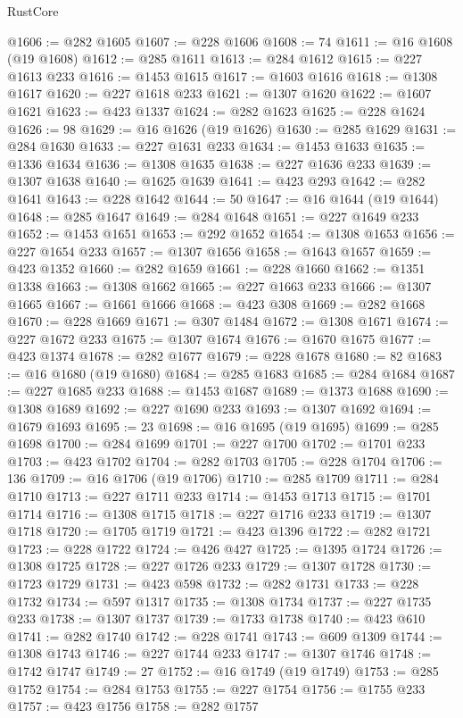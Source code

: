 \begin{lexlean}{RustCore}
\begin{coremodule}
@1606 := @282 @1605
@1607 := @228 @1606
@1608 := 74
@1611 := @16 @1608 (@19 @1608)
@1612 := @285 @1611
@1613 := @284 @1612
@1615 := @227 @1613 @233
@1616 := @1453 @1615
@1617 := @1603 @1616
@1618 := @1308 @1617
@1620 := @227 @1618 @233
@1621 := @1307 @1620
@1622 := @1607 @1621
@1623 := @423 @1337
@1624 := @282 @1623
@1625 := @228 @1624
@1626 := 98
@1629 := @16 @1626 (@19 @1626)
@1630 := @285 @1629
@1631 := @284 @1630
@1633 := @227 @1631 @233
@1634 := @1453 @1633
@1635 := @1336 @1634
@1636 := @1308 @1635
@1638 := @227 @1636 @233
@1639 := @1307 @1638
@1640 := @1625 @1639
@1641 := @423 @293
@1642 := @282 @1641
@1643 := @228 @1642
@1644 := 50
@1647 := @16 @1644 (@19 @1644)
@1648 := @285 @1647
@1649 := @284 @1648
@1651 := @227 @1649 @233
@1652 := @1453 @1651
@1653 := @292 @1652
@1654 := @1308 @1653
@1656 := @227 @1654 @233
@1657 := @1307 @1656
@1658 := @1643 @1657
@1659 := @423 @1352
@1660 := @282 @1659
@1661 := @228 @1660
@1662 := @1351 @1338
@1663 := @1308 @1662
@1665 := @227 @1663 @233
@1666 := @1307 @1665
@1667 := @1661 @1666
@1668 := @423 @308
@1669 := @282 @1668
@1670 := @228 @1669
@1671 := @307 @1484
@1672 := @1308 @1671
@1674 := @227 @1672 @233
@1675 := @1307 @1674
@1676 := @1670 @1675
@1677 := @423 @1374
@1678 := @282 @1677
@1679 := @228 @1678
@1680 := 82
@1683 := @16 @1680 (@19 @1680)
@1684 := @285 @1683
@1685 := @284 @1684
@1687 := @227 @1685 @233
@1688 := @1453 @1687
@1689 := @1373 @1688
@1690 := @1308 @1689
@1692 := @227 @1690 @233
@1693 := @1307 @1692
@1694 := @1679 @1693
@1695 := 23
@1698 := @16 @1695 (@19 @1695)
@1699 := @285 @1698
@1700 := @284 @1699
@1701 := @227 @1700
@1702 := @1701 @233
@1703 := @423 @1702
@1704 := @282 @1703
@1705 := @228 @1704
@1706 := 136
@1709 := @16 @1706 (@19 @1706)
@1710 := @285 @1709
@1711 := @284 @1710
@1713 := @227 @1711 @233
@1714 := @1453 @1713
@1715 := @1701 @1714
@1716 := @1308 @1715
@1718 := @227 @1716 @233
@1719 := @1307 @1718
@1720 := @1705 @1719
@1721 := @423 @1396
@1722 := @282 @1721
@1723 := @228 @1722
@1724 := @426 @427
@1725 := @1395 @1724
@1726 := @1308 @1725
@1728 := @227 @1726 @233
@1729 := @1307 @1728
@1730 := @1723 @1729
@1731 := @423 @598
@1732 := @282 @1731
@1733 := @228 @1732
@1734 := @597 @1317
@1735 := @1308 @1734
@1737 := @227 @1735 @233
@1738 := @1307 @1737
@1739 := @1733 @1738
@1740 := @423 @610
@1741 := @282 @1740
@1742 := @228 @1741
@1743 := @609 @1309
@1744 := @1308 @1743
@1746 := @227 @1744 @233
@1747 := @1307 @1746
@1748 := @1742 @1747
@1749 := 27
@1752 := @16 @1749 (@19 @1749)
@1753 := @285 @1752
@1754 := @284 @1753
@1755 := @227 @1754
@1756 := @1755 @233
@1757 := @423 @1756
@1758 := @282 @1757

\end{coremodule}
\end{lexlean}
